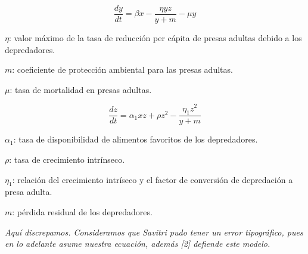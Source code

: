 \documentclass{beamer}
\begin{document}
\begin{frame}
    {\bf $$\frac{dy}{dt} = \beta x-\frac{\eta yz}{y+m}-\mu y$$}

    $\eta$: valor máximo de la tasa de reducción per cápita de presas adultas debido a los depredadores.
    \vspace*{0.3cm}

    $m$: coeficiente de protección ambiental para las presas adultas.
    \vspace*{0.3cm}

    $\mu$: tasa de mortalidad en presas adultas.
\end{frame}

\begin{frame}
    {\bf $$\frac{dz}{dt} = \alpha_1 xz+\rho z^2-\frac{\eta_1z^2}{y+m}$$}


    $\alpha_1$: tasa de disponibilidad de alimentos favoritos de los depredadores.

    $\rho$: tasa de crecimiento intrínseco.







    $\eta_1$: relación del crecimiento intríseco y el factor de conversión de depredación a presa adulta.

    $m$: pérdida residual de los depredadores.
    \vspace*{0.7cm}

    {\it\scriptsize Aquí discrepamos. Consideramos que Savitri pudo tener un error tipográfico, pues en lo adelante asume nuestra
    ecuación, además [2] defiende este modelo.}

\end{frame}
\end{document}
